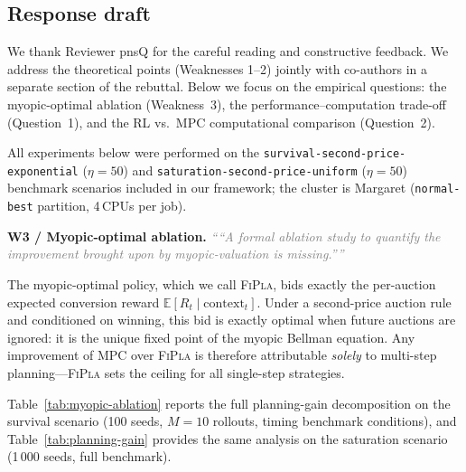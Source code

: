 \documentclass[11pt]{article}
\newcommand{\reviewer}[1]{\textit{\textcolor{gray}{``#1''}}}
\begin{document}
\newpage
\subsection*{Response draft}

We thank Reviewer pnsQ for the careful reading and constructive feedback.  We address the
theoretical points (Weaknesses 1--2) jointly with co-authors in a separate section of the
rebuttal.  Below we focus on the empirical questions: the myopic-optimal ablation
(Weakness~3), the performance--computation trade-off (Question~1), and the RL vs.\ MPC
computational comparison (Question~2).

All experiments below were performed on the \texttt{survival-second-price-exponential}
($\eta{=}50$) and \texttt{saturation-second-price-uniform} ($\eta{=}50$) benchmark
scenarios included in our framework; the cluster is Margaret
(\texttt{normal-best} partition, 4\,CPUs per job).

\bigskip

\noindent\textbf{W3 / Myopic-optimal ablation.}\quad
\reviewer{``A formal ablation study to quantify the improvement brought upon by
myopic-valuation is missing.''}

\medskip

The myopic-optimal policy, which we call \textsc{FiPla}, bids exactly the
per-auction expected conversion reward $\mathbb{E}[R_t \mid \text{context}_t]$.
Under a second-price auction rule and conditioned on winning, this bid is exactly
optimal when future auctions are ignored: it is the unique fixed point of the
myopic Bellman equation.  Any improvement of MPC over \textsc{FiPla} is therefore
attributable \emph{solely} to multi-step planning---\textsc{FiPla} sets the ceiling
for all single-step strategies.

Table~\ref{tab:myopic-ablation} reports the full planning-gain decomposition on the
survival scenario (100 seeds, $M{=}10$ rollouts, timing benchmark conditions),
and Table~\ref{tab:planning-gain} provides the same analysis on the saturation
scenario (1\,000 seeds, full benchmark).
\end{document}
